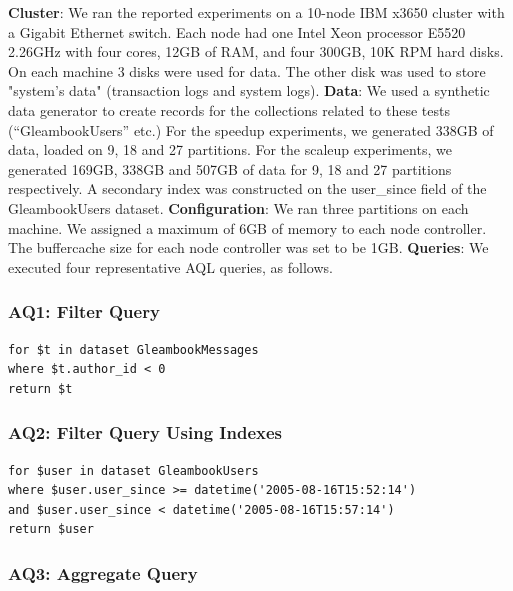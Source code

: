 \noindent\textbf{Cluster}: We ran the reported experiments on a 10-node IBM x3650 cluster with a Gigabit Ethernet switch. Each node had one Intel Xeon processor E5520 2.26GHz with four cores, 12GB of RAM, and four 300GB, 10K RPM hard disks. On each machine 3 disks were used for data. The other disk was used to store "system's data" (transaction logs and system logs).
\noindent\textbf{Data}: We used a synthetic data generator to create records for the collections related to these tests (``GleambookUsers'' etc.) For the speedup experiments, we generated 338GB of data, loaded on 9, 18 and 27 partitions. For the scaleup experiments, we generated 169GB, 338GB and 507GB of data for 9, 18 and 27 partitions respectively. A secondary index was constructed on the user\_since field of the GleambookUsers dataset.
\noindent\textbf{Configuration}: We ran three partitions on each machine. 
We assigned a maximum of 6GB of memory to each node controller. 
The buffercache size for each node controller was set to be 1GB.
\noindent\textbf{Queries}: We executed four representative AQL queries, as follows.

\subsubsection*{AQ1: Filter Query}

\begin{lstlisting}
for $t in dataset GleambookMessages
where $t.author_id < 0
return $t
\end{lstlisting}


\subsubsection*{AQ2: Filter Query Using Indexes}

\begin{lstlisting}
for $user in dataset GleambookUsers
where $user.user_since >= datetime('2005-08-16T15:52:14') 
and $user.user_since < datetime('2005-08-16T15:57:14') 
return $user
\end{lstlisting}



\subsubsection*{AQ3: Aggregate Query}


